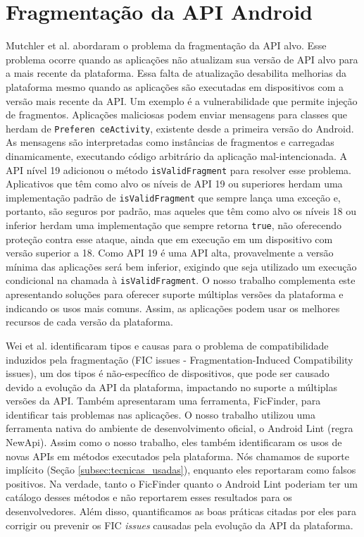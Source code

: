 \section{Fragmentação da API Android}

Mutchler et al. \cite{Mutchler2016} abordaram o problema da fragmentação da API alvo.
Esse problema ocorre quando as aplicações não atualizam sua versão de API alvo para a
mais recente da plataforma. Essa falta de atualização desabilita melhorias da plataforma
mesmo quando as aplicações são executadas em dispositivos com a versão mais recente da API.
Um exemplo é a vulnerabilidade que permite injeção de fragmentos. Aplicações maliciosas
podem enviar mensagens para classes que herdam de \texttt{Preferen ceActivity}, existente
desde a primeira versão do Android. As mensagens são interpretadas como instâncias de
fragmentos e carregadas dinamicamente, executando código arbitrário da aplicação
mal-intencionada. A API nível 19 adicionou o método \texttt{isValidFragment} para resolver
esse problema. Aplicativos que têm como alvo os níveis de API 19 ou superiores herdam uma implementação padrão de \texttt{isValidFragment} que sempre lança uma exceção e, portanto,
são seguros por padrão, mas aqueles que têm como alvo os níveis 18 ou inferior herdam uma implementação que sempre retorna \texttt{true}, não oferecendo proteção contra esse ataque,
ainda que em execução em um dispositivo com versão superior a 18.  Como API 19 é uma API
alta, provavelmente a versão mínima das aplicações  será bem inferior, exigindo que seja
utilizado um execução condicional na chamada à \texttt{isValidFragment}. O nosso trabalho
complementa este apresentando soluções para oferecer suporte múltiplas versões da plataforma
e indicando os usos mais comuns. Assim, as aplicações podem usar os melhores recursos de cada
versão da plataforma. 

Wei et al. \cite{Wei2016} identificaram tipos e causas para o problema de compatibilidade
induzidos pela fragmentação (FIC issues - Fragmentation-Induced Compatibility issues), um
dos tipos é não-específico de dispositivos, que pode ser causado devido a evolução da API da
plataforma, impactando no suporte a múltiplas versões da API. Também apresentaram uma ferramenta, 
FicFinder, para identificar tais problemas nas aplicações. O nosso trabalho utilizou uma ferramenta 
nativa do ambiente de desenvolvimento oficial, o Android Lint (regra NewApi). Assim como o nosso 
trabalho, eles também identificaram os usos de novas APIs em métodos executados pela plataforma. Nós 
chamamos de suporte implícito (Seção \ref{subsec:tecnicas_usadas}), enquanto eles reportaram como 
falsos positivos. Na verdade, tanto o FicFinder quanto o Android Lint poderiam ter um catálogo desses 
métodos e não reportarem esses resultados para os desenvolvedores. Além disso, quantificamos as boas 
práticas citadas por eles para corrigir ou prevenir os FIC \textit{issues} causadas pela evolução da API da plataforma.


